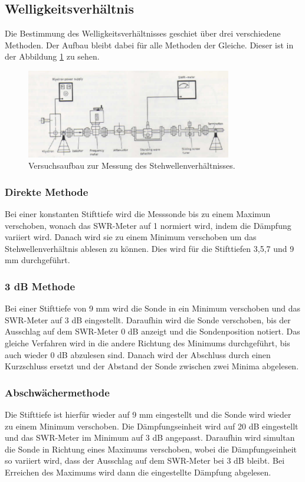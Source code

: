 \subsection{Welligkeitsverhältnis}

Die Bestimmung des Welligkeitsverhältnisses geschiet über drei verschiedene Methoden. Der Aufbau bleibt dabei für alle Methoden der Gleiche. Dieser ist in der Abbildung \ref{fig:swr} zu sehen.

\begin{figure}
    \centering
    \includegraphics[width=0.8\textwidth]{Bilder/aufbau_swr.png}
    \caption{Versuchsaufbau zur Messung des Stehwellenverhältnisses.}
    \label{fig:swr}
\end{figure}
\FloatBarrier


\subsubsection{Direkte Methode}
 
Bei einer konstanten Stifttiefe wird die Messsonde bis zu einem Maximun verschoben, wonach das SWR-Meter auf 1 normiert wird, indem die Dämpfung variiert wird. Danach wird sie zu
einem Minimum verschoben um das Stehwellenverhältnis ablesen zu können. Dies wird für die Stifttiefen 3,5,7 und 9 $\si{\mm}$ durchgeführt.

\subsubsection{3 dB Methode}
Bei einer Stifttiefe von 9 mm wird die Sonde in ein Minimum verschoben und das SWR-Meter auf 3 dB eingestellt. Daraufhin wird die Sonde verschoben, bis 
der Ausschlag auf dem SWR-Meter 0 dB anzeigt und die Sondenposition notiert. Das gleiche Verfahren wird in die andere Richtung des Minimums durchgeführt, bis auch wieder 0 dB 
abzulesen sind. Danach wird der Abschluss durch einen Kurzschluss ersetzt und der Abstand der Sonde zwischen zwei Minima abgelesen.


\subsubsection{Abschwächermethode}
Die Stifttiefe ist hierfür wieder auf 9 mm eingestellt und die Sonde wird wieder zu einem Minimum verschoben. Die Dämpfungseinheit wird auf 20 dB eingestellt und das SWR-Meter im 
Minimum auf 3 dB angepasst. Daraufhin wird simultan die Sonde in Richtung eines Maximums verschoben, wobei die Dämpfungseinheit so variiert wird, dass der Ausschlag auf dem SWR-Meter 
bei 3 dB bleibt. Bei Erreichen des Maximums wird dann die eingestellte Dämpfung abgelesen. 
